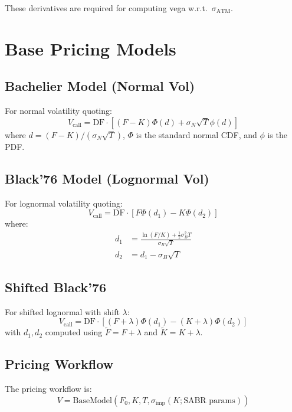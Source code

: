 \documentclass[12pt,a4paper]{report}
\begin{document}
These derivatives are required for computing vega w.r.t.\ $\sigma_{\text{ATM}}$.

\section{Base Pricing Models}

\subsection{Bachelier Model (Normal Vol)}

For normal volatility quoting:
\begin{equation}
    V_{\text{call}} = \text{DF} \cdot \left[(F-K)\Phi(d) + \sigma_N\sqrt{T}\phi(d)\right]
\end{equation}
where $d = (F-K)/(\sigma_N\sqrt{T})$, $\Phi$ is the standard normal CDF, and $\phi$ is the PDF.

\subsection{Black'76 Model (Lognormal Vol)}

For lognormal volatility quoting:
\begin{equation}
    V_{\text{call}} = \text{DF} \cdot \left[F\Phi(d_1) - K\Phi(d_2)\right]
\end{equation}
where:
\begin{align}
    d_1 &= \frac{\ln(F/K) + \frac{1}{2}\sigma_B^2 T}{\sigma_B\sqrt{T}} \\
    d_2 &= d_1 - \sigma_B\sqrt{T}
\end{align}

\subsection{Shifted Black'76}

For shifted lognormal with shift $\lambda$:
\begin{equation}
    V_{\text{call}} = \text{DF} \cdot \left[(F+\lambda)\Phi(d_1) - (K+\lambda)\Phi(d_2)\right]
\end{equation}
with $d_1, d_2$ computed using $\tilde{F} = F + \lambda$ and $\tilde{K} = K + \lambda$.

\subsection{Pricing Workflow}

The pricing workflow is:
\begin{equation}
    V = \text{BaseModel}(F_0, K, T, \sigma_{\text{imp}}(K; \text{SABR params}))
\end{equation}
\end{document}
